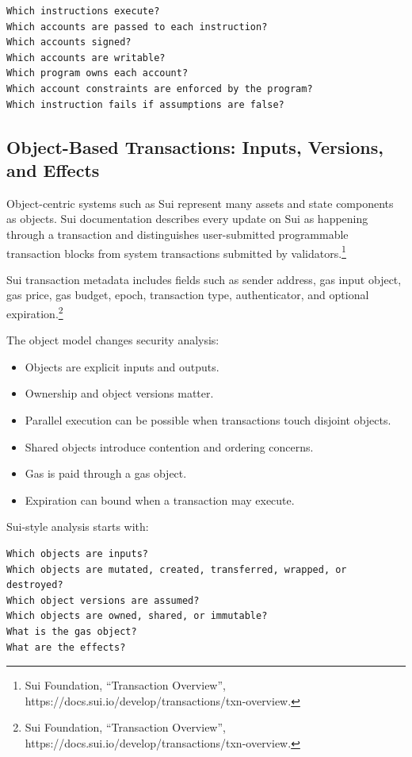\begin{lstlisting}
Which instructions execute?
Which accounts are passed to each instruction?
Which accounts signed?
Which accounts are writable?
Which program owns each account?
Which account constraints are enforced by the program?
Which instruction fails if assumptions are false?
\end{lstlisting}

\subsection{Object-Based Transactions: Inputs, Versions, and Effects}

Object-centric systems such as Sui represent many assets and state
components as objects. Sui documentation describes every update on Sui
as happening through a transaction and distinguishes user-submitted
programmable transaction blocks from system transactions submitted by
validators.\footnote{Sui Foundation, ``Transaction Overview'',
  https://docs.sui.io/develop/transactions/txn-overview.}

Sui transaction metadata includes fields such as sender address, gas
input object, gas price, gas budget, epoch, transaction type,
authenticator, and optional expiration.\footnote{Sui Foundation,
  ``Transaction Overview'',
  https://docs.sui.io/develop/transactions/txn-overview.}

The object model changes security analysis:

\begin{itemize}
\tightlist
\item
  Objects are explicit inputs and outputs.
\item
  Ownership and object versions matter.
\item
  Parallel execution can be possible when transactions touch disjoint
  objects.
\item
  Shared objects introduce contention and ordering concerns.
\item
  Gas is paid through a gas object.
\item
  Expiration can bound when a transaction may execute.
\end{itemize}

Sui-style analysis starts with:

\begin{lstlisting}
Which objects are inputs?
Which objects are mutated, created, transferred, wrapped, or destroyed?
Which object versions are assumed?
Which objects are owned, shared, or immutable?
What is the gas object?
What are the effects?
\end{lstlisting}

